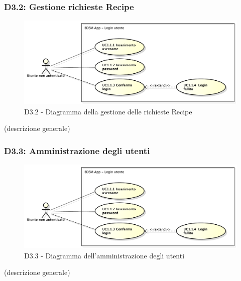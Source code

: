 		\subsubsection{D3.2: Gestione richieste Recipe} %
		\label{ssub:gestione_richieste_recipe}
		\begin{figure}[!htbp]
			\centering
			\centerline{\includegraphics[scale=0.45]{./images/UC1_1.pdf}}
			\caption{D3.2 - Diagramma della gestione delle richieste Recipe}
		\end{figure}
		\noindent
		[TO DO] (descrizione generale)

		\subsubsection{D3.3: Amministrazione degli utenti} %
		\label{ssub:amministrazione_degli_utenti}
		\begin{figure}[!htbp]
			\centering
			\centerline{\includegraphics[scale=0.45]{./images/UC1_1.pdf}}
			\caption{D3.3 - Diagramma dell'amministrazione degli utenti}
		\end{figure}
		\noindent
		[TO DO] (descrizione generale)








